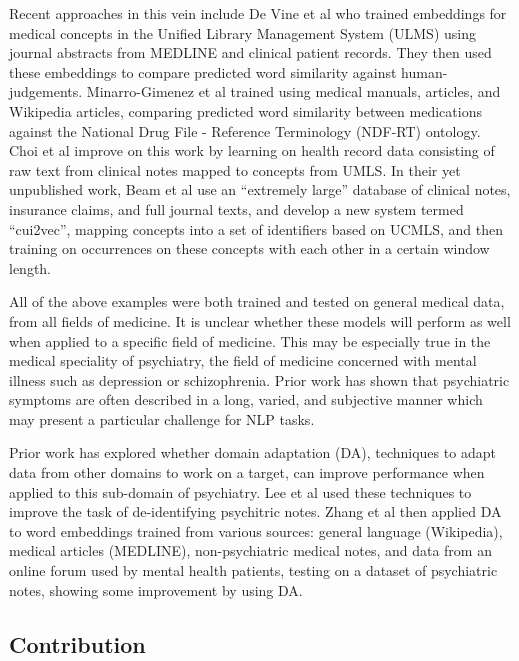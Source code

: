 \documentclass[10pt]{article}
\begin{document}
Recent approaches in this vein include De Vine et al  who trained embeddings for medical concepts in the Unified Library Management System (ULMS) using journal abstracts from MEDLINE and clinical patient records. They then used these embeddings to compare predicted word similarity against human-judgements. Minarro-Gimenez et al  trained using medical manuals, articles, and Wikipedia articles, comparing predicted word similarity between medications against the National Drug File - Reference Terminology (NDF-RT) ontology. Choi et al \cite{choiLearningLowDimensionalRepresentations2016} improve on this work by learning on health record data consisting of raw text from clinical notes mapped to concepts from UMLS. In their yet unpublished work, Beam et al \cite{beamClinicalConceptEmbeddings2018} use an ``extremely large'' database of clinical notes, insurance claims, and full journal texts, and develop a new system termed ``cui2vec'', mapping concepts into a set of identifiers based on UCMLS, and then training on occurrences on these concepts with each other in a certain window length. 

All of the above examples were both trained and tested on general medical data, from all fields of medicine. It is unclear whether these models will perform as well when applied to a specific field of medicine. This may be especially true in the medical speciality of psychiatry, the field of medicine concerned with mental illness such as depression or schizophrenia. Prior work has shown that psychiatric symptoms are often described in a long, varied, and subjective manner \cite{forbushSittingPinsNeedles2013} which may present a particular challenge for NLP tasks. 

Prior work has explored whether domain adaptation (DA), techniques to adapt data from other domains to work on a target, can improve performance when applied to this sub-domain of psychiatry. Lee et al \cite{leeLeveragingExistingCorpora2018} used these techniques to improve the task of de-identifying psychitric notes. Zhang et al \cite{zhangAdaptingWordEmbeddings2018} then applied DA to word embeddings trained from various sources: general language (Wikipedia), medical articles (MEDLINE), non-psychiatric medical notes, and data from an online forum used by mental health patients, testing on a dataset of psychiatric notes, showing some improvement by using DA. 

\subsection{Contribution}
\end{document}
